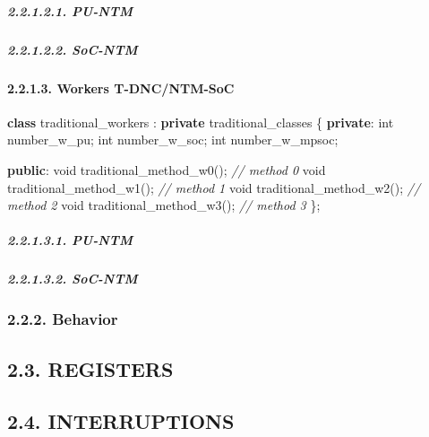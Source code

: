 \documentclass[
]{article}
\newenvironment{Shaded}{}{}
\newcommand{\CommentTok}[1]{\textcolor[rgb]{0.38,0.63,0.69}{\textit{#1}}}
\newcommand{\DataTypeTok}[1]{\textcolor[rgb]{0.56,0.13,0.00}{#1}}
\newcommand{\KeywordTok}[1]{\textcolor[rgb]{0.00,0.44,0.13}{\textbf{#1}}}
\newcommand{\NormalTok}[1]{#1}
\begin{document}
\hypertarget{pu-ntm-1}{%
\subparagraph{2.2.1.2.1. PU-NTM}\label{pu-ntm-1}}

\hypertarget{soc-ntm-1}{%
\subparagraph{2.2.1.2.2. SoC-NTM}\label{soc-ntm-1}}

\hypertarget{workers-t-dncntm-soc}{%
\paragraph{2.2.1.3. Workers T-DNC/NTM-SoC}\label{workers-t-dncntm-soc}}

\begin{Shaded}
\begin{Highlighting}[]
\KeywordTok{class}\NormalTok{ traditional\_workers : }\KeywordTok{private}\NormalTok{ traditional\_classes \{}
   \KeywordTok{private}\NormalTok{:}
      \DataTypeTok{int}\NormalTok{ number\_w\_pu;}
      \DataTypeTok{int}\NormalTok{ number\_w\_soc;}
      \DataTypeTok{int}\NormalTok{ number\_w\_mpsoc;}

   \KeywordTok{public}\NormalTok{:}
      \DataTypeTok{void}\NormalTok{ traditional\_method\_w0();  }\CommentTok{// method 0}
      \DataTypeTok{void}\NormalTok{ traditional\_method\_w1();  }\CommentTok{// method 1}
      \DataTypeTok{void}\NormalTok{ traditional\_method\_w2();  }\CommentTok{// method 2}
      \DataTypeTok{void}\NormalTok{ traditional\_method\_w3();  }\CommentTok{// method 3}
\NormalTok{\};}
\end{Highlighting}
\end{Shaded}

\hypertarget{pu-ntm-2}{%
\subparagraph{2.2.1.3.1. PU-NTM}\label{pu-ntm-2}}

\hypertarget{soc-ntm-2}{%
\subparagraph{2.2.1.3.2. SoC-NTM}\label{soc-ntm-2}}

\hypertarget{behavior}{%
\subsubsection{2.2.2. Behavior}\label{behavior}}

\hypertarget{registers}{%
\subsection{2.3. REGISTERS}\label{registers}}

\hypertarget{interruptions}{%
\subsection{2.4. INTERRUPTIONS}\label{interruptions}}
\end{document}
